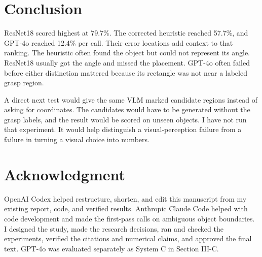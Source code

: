 \documentclass[10pt,conference,compsoc]{IEEEtran}
\begin{document}
\section{Conclusion}

ResNet18 scored highest at 79.7\%. The corrected heuristic reached 57.7\%, and
GPT-4o reached 12.4\% per call. Their error locations add context to that
ranking. The heuristic often found the object but could not represent
its angle. ResNet18 usually got the angle and missed the placement. GPT-4o
often failed before either distinction mattered because its rectangle was not
near a labeled grasp region.

A direct next test would give the same VLM marked candidate regions instead
of asking for coordinates. The candidates would have to be generated without
the grasp labels, and the result would be scored on unseen objects. I have not
run that experiment. It would help distinguish a visual-perception failure
from a failure in turning a visual choice into numbers.

\section*{Acknowledgment}

OpenAI Codex helped restructure, shorten, and edit this manuscript from my
existing report, code, and verified results. Anthropic Claude Code helped with
code development and made the first-pass calls on ambiguous object
boundaries. I designed the study, made the research decisions, ran and checked
the experiments, verified the citations and numerical claims, and approved
the final text. GPT-4o was evaluated separately as System C in Section III-C.
\end{document}
